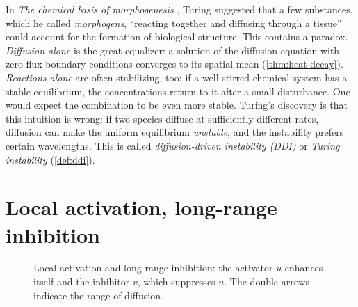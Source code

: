 In \emph{The chemical basis of morphogenesis} \cite{Turing1952}, Turing suggested
that a few substances, which he called \emph{morphogens}, ``reacting together and
diffusing through a tissue'' could account for the formation of biological
structure. This contains a paradox. \emph{Diffusion alone} is the great equalizer:
a solution of the diffusion equation with zero-flux boundary conditions converges to
its spatial mean (\cref{thm:heat-decay}). \emph{Reactions alone} are often
stabilizing, too: if a well-stirred chemical system has a stable equilibrium, the
concentrations return to it after a small disturbance. One would expect the
combination to be even more stable. Turing's discovery is that this intuition is
wrong: if two species diffuse at sufficiently different rates, diffusion can make the
uniform equilibrium \emph{unstable}, and the instability prefers certain
wavelengths. This is called \emph{diffusion-driven instability (DDI)} or
\emph{Turing instability} (\cref{def:ddi}).

\section{Local activation, long-range inhibition}\label{sec:intro-activation}

\begin{figure}[t]
  \centering
  \caption{Local activation and long-range inhibition: the activator $u$ enhances
  itself and the inhibitor $v$, which suppresses $u$. The double arrows indicate the
  range of diffusion.}
  \label{fig:ch01-activator-inhibitor}
\end{figure}

